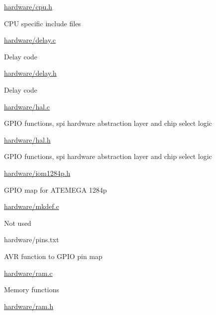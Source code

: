 \begin{DoxyItemize}
\begin{DoxyItemize}
\item \hyperlink{cpu_8h}{hardware/cpu.\+h}
\begin{DoxyItemize}
\item C\+PU specific include files
\end{DoxyItemize}
\item \hyperlink{delay_8c}{hardware/delay.\+c}
\begin{DoxyItemize}
\item Delay code
\end{DoxyItemize}
\item \hyperlink{delay_8h}{hardware/delay.\+h}
\begin{DoxyItemize}
\item Delay code
\end{DoxyItemize}
\item \hyperlink{hal_8c}{hardware/hal.\+c}
\begin{DoxyItemize}
\item G\+P\+IO functions, spi hardware abstraction layer and chip select logic
\end{DoxyItemize}
\item \hyperlink{hal_8h}{hardware/hal.\+h}
\begin{DoxyItemize}
\item G\+P\+IO functions, spi hardware abstraction layer and chip select logic
\end{DoxyItemize}
\item \hyperlink{iom1284p_8h}{hardware/iom1284p.\+h}
\begin{DoxyItemize}
\item G\+P\+IO map for A\+T\+E\+M\+E\+GA 1284p
\end{DoxyItemize}
\item \hyperlink{mkdef_8c}{hardware/mkdef.\+c}
\begin{DoxyItemize}
\item Not used
\end{DoxyItemize}
\item hardware/pins.\+txt
\begin{DoxyItemize}
\item A\+VR function to G\+P\+IO pin map
\end{DoxyItemize}
\item \hyperlink{ram_8c}{hardware/ram.\+c}
\begin{DoxyItemize}
\item Memory functions
\end{DoxyItemize}
\item \hyperlink{ram_8h}{hardware/ram.\+h}

\end{DoxyItemize}
\end{DoxyItemize}
